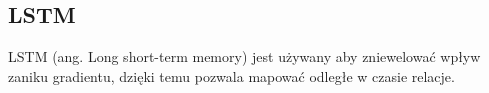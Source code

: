 \subsection{LSTM} 
LSTM (ang. Long short-term memory) jest używany aby zniewelować wpływ zaniku gradientu, dzięki 
temu pozwala mapować odległe w czasie relacje.    